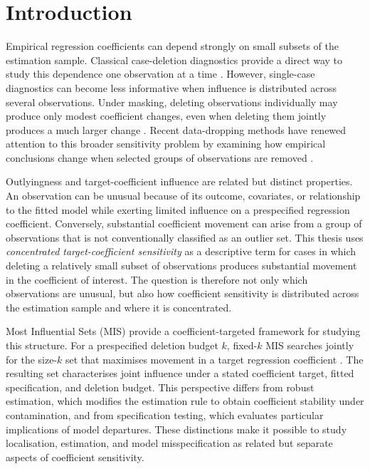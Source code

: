 \documentclass[../main.tex]{subfiles}
\begin{document}
\section{Introduction}
\label{sec:introduction}
Empirical regression coefficients can depend strongly on small subsets of the estimation sample. Classical case-deletion diagnostics provide a direct way to study this dependence one observation at a time \parencite{cook2000detection,belsley2005regression}. However, single-case diagnostics can become less informative when influence is distributed across several observations. Under masking, deleting observations individually may produce only modest coefficient changes, even when deleting them jointly produces a much larger change \parencite{rousseeuw1990unmasking,hadi1993procedures}. Recent data-dropping methods have renewed attention to this broader sensitivity problem by examining how empirical conclusions change when selected groups of observations are removed \parencite{broderick2020automatic,kuschnig2021hidden}.

Outlyingness and target-coefficient influence are related but distinct properties. An observation can be unusual because of its outcome, covariates, or relationship to the fitted model while exerting limited influence on a prespecified regression coefficient. Conversely, substantial coefficient movement can arise from a group of observations that is not conventionally classified as an outlier set. This thesis uses \emph{concentrated target-coefficient sensitivity} as a descriptive term for cases in which deleting a relatively small subset of observations produces substantial movement in the coefficient of interest. The question is therefore not only which observations are unusual, but also how coefficient sensitivity is distributed across the estimation sample and where it is concentrated.

Most Influential Sets (MIS) provide a coefficient-targeted framework for studying this structure. For a prespecified deletion budget \(k\), fixed-\(k\) MIS searches jointly for the size-\(k\) set that maximises movement in a target regression coefficient \parencite{kuschnig2021hidden,hu2024most,konrad2026finding}. The resulting set characterises joint influence under a stated coefficient target, fitted specification, and deletion budget. This perspective differs from robust estimation, which modifies the estimation rule to obtain coefficient stability under contamination, and from specification testing, which evaluates particular implications of model departures. These distinctions make it possible to study localisation, estimation, and model misspecification as related but separate aspects of coefficient sensitivity.
\end{document}

